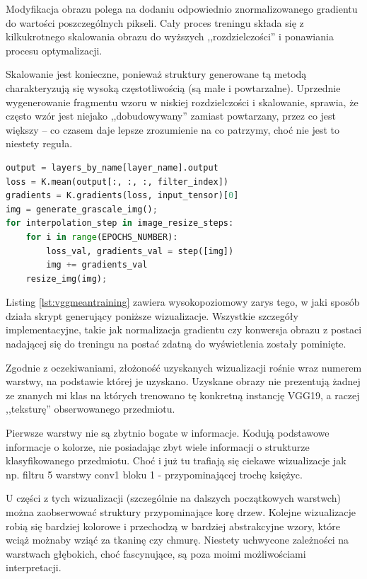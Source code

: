Modyfikacja obrazu polega na dodaniu odpowiednio znormalizowanego gradientu do wartości poszczególnych pikseli. Cały proces treningu składa się z kilkukrotnego skalowania obrazu do wyższych ,,rozdzielczości'' i ponawiania procesu optymalizacji. 

Skalowanie jest konieczne, ponieważ struktury generowane tą metodą charakteryzują się wysoką częstotliwością (są małe i powtarzalne). Uprzednie wygenerowanie fragmentu wzoru w niskiej rozdzielczości i skalowanie, sprawia, że często wzór jest niejako ,,dobudowywany'' zamiast powtarzany, przez co jest większy -- co czasem daje lepsze zrozumienie na co patrzymy, choć nie jest to niestety reguła.

\begin{lstlisting}[language=Python, caption={Wizualizowanie poprzez maksymalizację mediany wybranej warstwy.}, label={lst:vggmeantraining}, captionpos=b]
output = layers_by_name[layer_name].output
loss = K.mean(output[:, :, :, filter_index])
gradients = K.gradients(loss, input_tensor)[0]
img = generate_grascale_img();
for interpolation_step in image_resize_steps:
    for i in range(EPOCHS_NUMBER):
        loss_val, gradients_val = step([img])
        img += gradients_val 
    resize_img(img);
\end{lstlisting}

Listing \ref{lst:vggmeantraining} zawiera wysokopoziomowy zarys tego, w jaki sposób działa skrypt generujący poniższe wizualizacje. Wszystkie szczegóły implementacyjne, takie jak normalizacja gradientu czy konwersja obrazu z postaci nadającej się do treningu na postać zdatną do wyświetlenia zostały pominięte.

Zgodnie z oczekiwaniami, złożoność uzyskanych wizualizacji rośnie wraz numerem warstwy, na podstawie której je uzyskano. Uzyskane obrazy nie prezentują żadnej ze znanych mi klas na których trenowano tę konkretną instancję VGG19, a raczej ,,teksturę'' obserwowanego przedmiotu.

Pierwsze warstwy nie są zbytnio bogate w informacje. Kodują podstawowe informacje o kolorze, nie posiadając zbyt wiele informacji o strukturze klasyfikowanego przedmiotu. Choć i już tu trafiają się ciekawe wizualizacje jak np. filtru 5 warstwy conv1 bloku 1 - przypominającej trochę księżyc. 

U części z tych wizualizacji (szczególnie na dalszych początkowych warstwch) można zaobserwować struktury przypominające korę drzew. Kolejne wizualizacje robią się bardziej kolorowe i przechodzą w bardziej abstrakcyjne wzory, które wciąż możnaby wziąć za tkaninę czy chmurę. Niestety uchwycone zależności na warstwach głębokich, choć fascynujące, są poza moimi możliwościami interpretacji.

